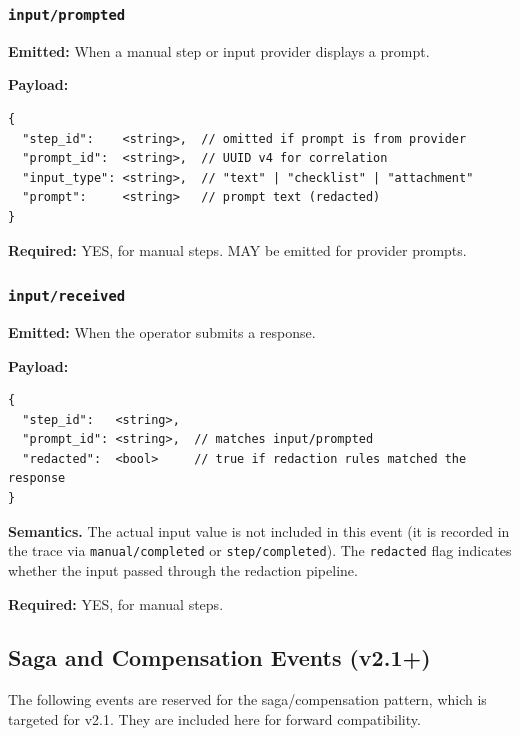 \subsubsection{\texttt{input/prompted}}

\textbf{Emitted:} When a manual step or input provider displays a prompt.

\textbf{Payload:}
\begin{verbatim}
{
  "step_id":    <string>,  // omitted if prompt is from provider
  "prompt_id":  <string>,  // UUID v4 for correlation
  "input_type": <string>,  // "text" | "checklist" | "attachment"
  "prompt":     <string>   // prompt text (redacted)
}
\end{verbatim}

\textbf{Required:} YES, for manual steps. MAY be emitted for provider prompts.


\subsubsection{\texttt{input/received}}

\textbf{Emitted:} When the operator submits a response.

\textbf{Payload:}
\begin{verbatim}
{
  "step_id":   <string>,
  "prompt_id": <string>,  // matches input/prompted
  "redacted":  <bool>     // true if redaction rules matched the response
}
\end{verbatim}

\textbf{Semantics.} The actual input value is not included in this event (it is recorded in the trace via \texttt{manual/completed} or \texttt{step/completed}). The \texttt{redacted} flag indicates whether the input passed through the redaction pipeline.

\textbf{Required:} YES, for manual steps.


\subsection{Saga and Compensation Events (v2.1+)}

The following events are reserved for the saga/compensation pattern, which is targeted for v2.1. They are included here for forward compatibility.

